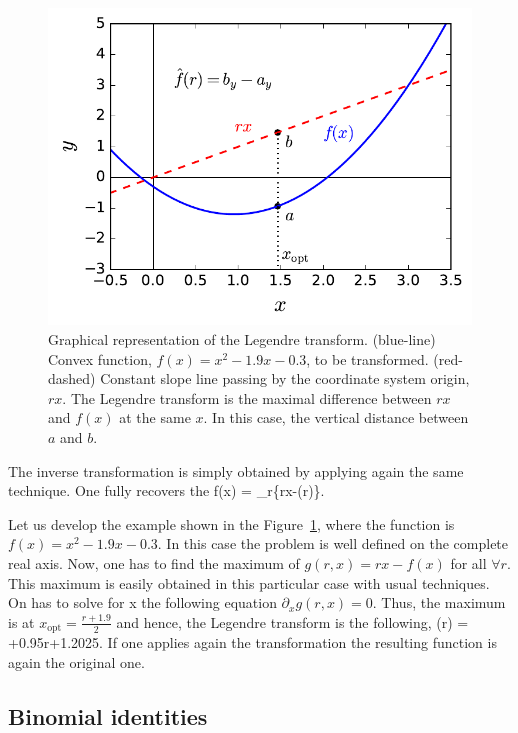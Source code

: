 \begin{figure}[htp]
  \centering
  \includegraphics[scale=.65]{img/plots/LT_legendre.pdf}
  \caption[Graphical representation of the Legendre trasnform.]{Graphical representation of the Legendre transform. (blue-line) Convex function, $f(x)=x^2-1.9x-0.3$, to be transformed. (red-dashed) Constant slope line passing by the coordinate system origin, $rx$. The Legendre transform is the maximal difference between $rx$ and $f(x)$ at the same $x$. In this case, the vertical distance between $a$ and $b$.}
  \label{fig:lt-geometric-legendre}
\end{figure}

The inverse transformation is simply obtained by applying again the same technique.
One fully recovers the
\be
  f(x) = \max_{r}\{rx-(r)\}.
\ee

Let us develop the example shown in the Figure~\ref{fig:lt-geometric-legendre}, where the function is $f(x)=x^2-1.9x-0.3$.
In this case the problem is well defined on the complete real axis.
Now, one has to find the maximum of $g(r,x)=rx-f(x)$ for all $\forall r$.
This maximum is easily obtained in this particular case with usual techniques.
On has to solve for x the following equation $\partial_x g(r,x) = 0$. Thus, the maximum is at $x_{\text{opt}} = \frac{r+1.9}{2}$ and hence, the Legendre transform is the following,
\be
  (r) = +0.95r+1.2025.
\ee
If one applies again the transformation the resulting function is again the original one.

\subsection{Binomial identities}
\label{app:binomial-identities}

